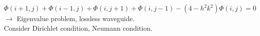 \documentclass{article}
\begin{document}
\begin{equation*}
    \Phi(i+1,j) + \Phi(i-1,j) + \Phi(i, j+1) + \Phi(i,j-1) - (4-h^2k^2)\Phi(i,j) =0
\end{equation*} 
$\rightarrow$ Eigenvalue problem, lossless waveguide.\\
Consider Dirichlet condition, Neumann condition. 
\end{document}
